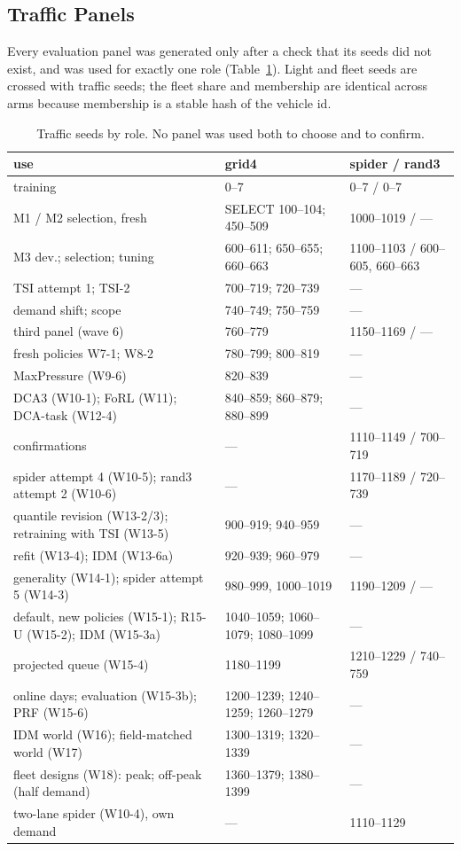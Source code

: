 \subsection{Traffic Panels}
Every evaluation panel was generated only after a check that its seeds did not exist, and was used for exactly one role
(Table~\ref{tab:panels}). Light and fleet seeds are crossed with traffic seeds; the fleet share and membership are identical across arms
because membership is a stable hash of the vehicle id.
\begin{table}[t]\centering\footnotesize\setlength{\tabcolsep}{2.5pt}
\caption{Traffic seeds by role. No panel was used both to choose and to confirm.}\label{tab:panels}\scriptsize
\begin{tabular}{@{}p{2.45cm}p{2.75cm}p{2.95cm}@{}}\toprule
use & grid4 & spider / rand3\\\midrule
training & 0--7 & 0--7 / 0--7\\
M1 / M2 selection, fresh & SELECT 100--104; 450--509 & 1000--1019 / ---\\
M3 dev.; selection; tuning & 600--611; 650--655; 660--663 & 1100--1103 / 600--605, 660--663\\
TSI attempt 1; TSI-2 & 700--719; 720--739 & ---\\
demand shift; scope & 740--749; 750--759 & ---\\
third panel (wave 6) & 760--779 & 1150--1169 / ---\\
fresh policies W7-1; W8-2 & 780--799; 800--819 & ---\\
MaxPressure (W9-6) & 820--839 & ---\\
DCA3 (W10-1); FoRL (W11); DCA-task (W12-4) & 840--859; 860--879; 880--899 & ---\\
confirmations & --- & 1110--1149 / 700--719\\
spider attempt 4 (W10-5); rand3 attempt 2 (W10-6) & --- & 1170--1189 / 720--739\\
quantile revision (W13-2/3); retraining with TSI (W13-5) & 900--919; 940--959 & ---\\
refit (W13-4); IDM (W13-6a) & 920--939; 960--979 & ---\\
generality (W14-1); spider attempt 5 (W14-3) & 980--999, 1000--1019 & 1190--1209 / ---\\
default, new policies (W15-1); R15-U (W15-2); IDM (W15-3a) & 1040--1059; 1060--1079; 1080--1099 & ---\\
projected queue (W15-4) & 1180--1199 & 1210--1229 / 740--759\\
online days; evaluation (W15-3b); PRF (W15-6) & 1200--1239; 1240--1259; 1260--1279 & ---\\
IDM world (W16); field-matched world (W17) & 1300--1319; 1320--1339 & ---\\
fleet designs (W18): peak; off-peak (half demand) & 1360--1379; 1380--1399 & ---\\
two-lane spider (W10-4), own demand & --- & 1110--1129\\\bottomrule
\end{tabular}\end{table}

